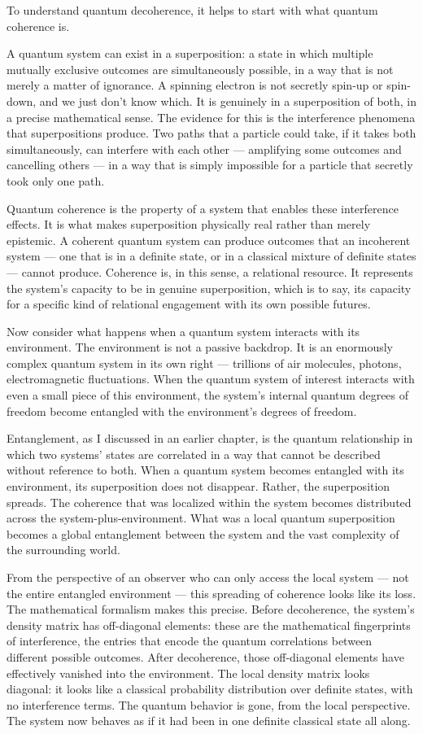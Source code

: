 To understand quantum decoherence, it helps to start with what quantum coherence is.

A quantum system can exist in a superposition: a state in which multiple mutually exclusive outcomes are simultaneously possible, in a way that is not merely a matter of ignorance.
A spinning electron is not secretly spin-up or spin-down, and we just don't know which.
It is genuinely in a superposition of both, in a precise mathematical sense.
The evidence for this is the interference phenomena that superpositions produce.
Two paths that a particle could take, if it takes both simultaneously, can interfere with each other --- amplifying some outcomes and cancelling others --- in a way that is simply impossible for a particle that secretly took only one path.

Quantum coherence is the property of a system that enables these interference effects.
It is what makes superposition physically real rather than merely epistemic.
A coherent quantum system can produce outcomes that an incoherent system --- one that is in a definite state, or in a classical mixture of definite states --- cannot produce.
Coherence is, in this sense, a relational resource.
It represents the system's capacity to be in genuine superposition, which is to say, its capacity for a specific kind of relational engagement with its own possible futures.

Now consider what happens when a quantum system interacts with its environment.
The environment is not a passive backdrop.
It is an enormously complex quantum system in its own right --- trillions of air molecules, photons, electromagnetic fluctuations.
When the quantum system of interest interacts with even a small piece of this environment, the system's internal quantum degrees of freedom become entangled with the environment's degrees of freedom.

Entanglement, as I discussed in an earlier chapter, is the quantum relationship in which two systems' states are correlated in a way that cannot be described without reference to both.
When a quantum system becomes entangled with its environment, its superposition does not disappear.
Rather, the superposition spreads.
The coherence that was localized within the system becomes distributed across the system-plus-environment.
What was a local quantum superposition becomes a global entanglement between the system and the vast complexity of the surrounding world.

From the perspective of an observer who can only access the local system --- not the entire entangled environment --- this spreading of coherence looks like its loss.
The mathematical formalism makes this precise.
Before decoherence, the system's density matrix has off-diagonal elements: these are the mathematical fingerprints of interference, the entries that encode the quantum correlations between different possible outcomes.
After decoherence, those off-diagonal elements have effectively vanished into the environment.
The local density matrix looks diagonal: it looks like a classical probability distribution over definite states, with no interference terms.
The quantum behavior is gone, from the local perspective.
The system now behaves as if it had been in one definite classical state all along.

